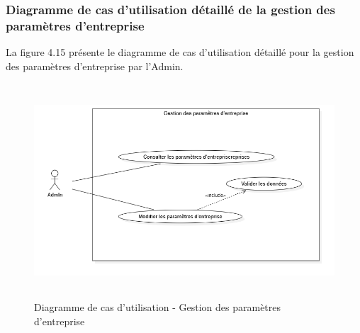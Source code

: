 \subsubsection{Diagramme de cas d'utilisation détaillé de la gestion des paramètres d'entreprise}
\noindent La figure 4.15 présente le diagramme de cas d'utilisation détaillé pour la gestion des paramètres d'entreprise par l'Admin.

\begin{figure}[H]
    \centering
    \includegraphics[width=12cm,height=8cm]{images/gestionparamcompanyuc.png}
    \caption{Diagramme de cas d'utilisation - Gestion des paramètres d'entreprise}
\end{figure}

